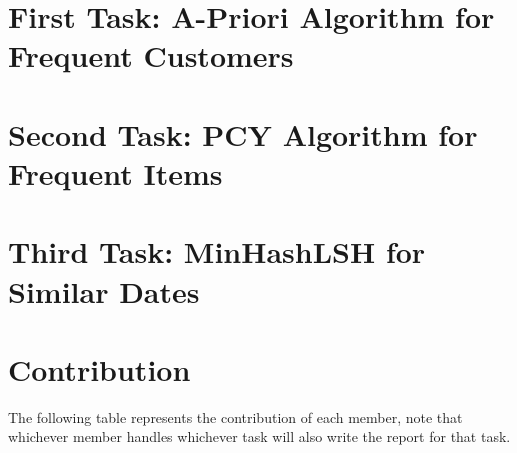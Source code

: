 \documentclass[conference]{IEEEtran}
\begin{document}
    \section{First Task: A-Priori Algorithm for Frequent Customers}
    \label{sec:first-task}
%    

    \section{Second Task: PCY Algorithm for Frequent Items}
    \label{sec:second-task}
%    

    \section{Third Task: MinHashLSH for Similar Dates}
    \label{sec:third-task}
%    

    \section{Contribution}
    \label{sec:contribution}

    The following table represents the contribution of each member, note that whichever member handles whichever task will also write the report for that task.

    \begin{table}[h]
        \centering
        \caption{Member Contributions}
        \setlength{\tabcolsep}{2pt} %
        \renewcommand{\arraystretch}{1} %
        \label{tab:contributions}
    \end{table}
\end{document}
